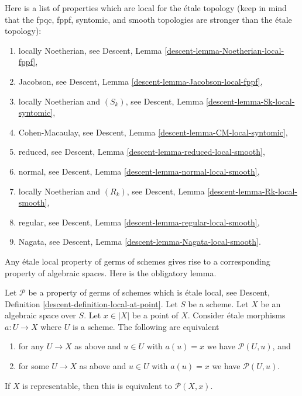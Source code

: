 \begin{remark}
\label{remark-list-properties-local-etale-topology}
Here is a list of properties which are local for the \'etale topology
(keep in mind that the fpqc, fppf, syntomic, and smooth topologies are
stronger than the \'etale topology):
\begin{enumerate}
\item locally Noetherian, see
Descent, Lemma \ref{descent-lemma-Noetherian-local-fppf},
\item Jacobson, see
Descent, Lemma \ref{descent-lemma-Jacobson-local-fppf},
\item locally Noetherian and $(S_k)$, see
Descent, Lemma \ref{descent-lemma-Sk-local-syntomic},
\item Cohen-Macaulay, see
Descent, Lemma \ref{descent-lemma-CM-local-syntomic},
\item reduced, see
Descent, Lemma \ref{descent-lemma-reduced-local-smooth},
\item normal, see
Descent, Lemma \ref{descent-lemma-normal-local-smooth},
\item locally Noetherian and $(R_k)$, see
Descent, Lemma \ref{descent-lemma-Rk-local-smooth},
\item regular, see
Descent, Lemma \ref{descent-lemma-regular-local-smooth},
\item Nagata, see
Descent, Lemma \ref{descent-lemma-Nagata-local-smooth}.
\end{enumerate}
\end{remark}

\noindent
Any \'etale local property of germs of schemes gives rise to a corresponding
property of algebraic spaces. Here is the obligatory lemma.

\begin{lemma}
\label{lemma-local-source-target-at-point}
Let $\mathcal{P}$ be a property of germs of schemes which is \'etale local, see
Descent, Definition \ref{descent-definition-local-at-point}.
Let $S$ be a scheme.
Let $X$ be an algebraic space over $S$.
Let $x \in |X|$ be a point of $X$.
Consider \'etale morphisms $a : U \to X$ where $U$ is a scheme.
The following are equivalent
\begin{enumerate}
\item for any $U \to X$ as above and $u \in U$ with $a(u) = x$ we have
$\mathcal{P}(U, u)$, and
\item for some $U \to X$ as above and $u \in U$ with $a(u) = x$ we have
$\mathcal{P}(U, u)$.
\end{enumerate}
If $X$ is representable, then this is equivalent to $\mathcal{P}(X, x)$.
\end{lemma}

